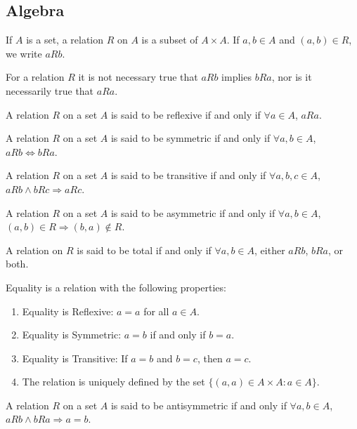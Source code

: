 \documentclass[crop=false,class=book]{standalone}
\begin{document}
\subsection{Algebra}
\begin{definition}
If $A$ is a set, a relation $R$ on $A$ is a subset of $A\times A$. If $a,b\in A$ and $(a,b)\in R$, we write $aR b$.
\end{definition}
\begin{remark}
For a relation $R$ it is not necessary true that $aRb$ implies $bRa$, nor is it necessarily true that $aRa$.
\end{remark}
\begin{definition}
A relation $R$ on a set $A$ is said to be reflexive if and only if $\forall a\in A$, $aRa$.
\end{definition}
\begin{definition}
A relation $R$ on a set $A$ is said to be symmetric if and only if $\forall a,b\in A$, $aRb\Leftrightarrow bRa$.
\end{definition}
\begin{definition}
A relation $R$ on a set $A$ is said to be transitive if and only if $\forall a,b,c\in A$, $aRb \land bRc \Rightarrow aRc$.
\end{definition}
\begin{definition}
A relation $R$ on a set $A$ is said to be asymmetric if and only if $\forall a,b\in A$, $(a,b)\in R\Rightarrow (b,a) \notin R$.
\end{definition}
\begin{definition}
A relation on $R$ is said to be total if and only if $\forall a,b \in A$, either $aRb$, $bRa$, or both.
\end{definition}
\begin{definition}
Equality is a relation with the following properties:
\begin{enumerate}
\item Equality is Reflexive: $a=a$ for all $a\in A$.
\item Equality is Symmetric: $a=b$ if and only if $b=a$.
\item Equality is Transitive: If $a=b$ and $b=c$, then $a=c$.
\item The relation is uniquely defined by the set $\{(a,a)\in A\times A:a\in A\}$.
\end{enumerate}
\end{definition}
\begin{definition}
A relation $R$ on a set $A$ is said to be antisymmetric if and only if $\forall a,b \in A$, $aRb\land bRa\Rightarrow a=b$.
\end{definition}
\end{document}
